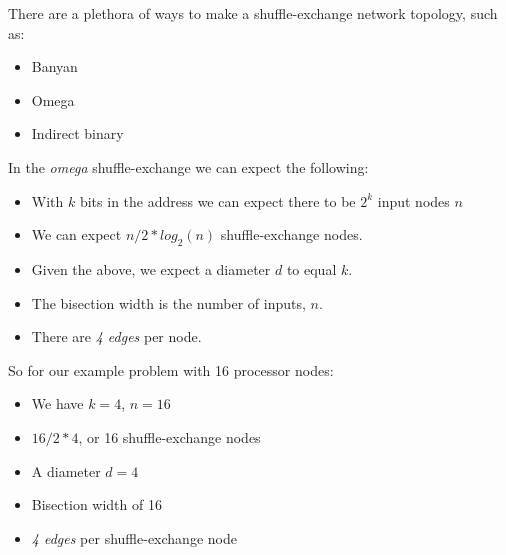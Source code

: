 \documentclass{article}
\begin{document}

\noindent There are a plethora of ways to make a shuffle-exchange network topology, such as:
\begin{itemize}
    \item Banyan
    \item Omega
    \item Indirect binary
\end{itemize}

\noindent In the \textit{omega} shuffle-exchange we can expect the following:
\begin{itemize}
    \item With $k$ bits in the address we can expect there to be $2^k$ input nodes $n$
    \item We can expect $n / 2 * log_2(n)$ shuffle-exchange nodes.
    \item Given the above, we expect a diameter $d$ to equal $k$.
    \item The bisection width is the number of inputs, $n$.
    \item There are \textit{4 edges} per node.
\end{itemize}

\noindent So for our example problem with 16 processor nodes:
\begin{itemize}
    \item We have $k = 4$, $n = 16$
    \item $16 / 2 * 4$, or 16 shuffle-exchange nodes
    \item A diameter $d = 4$
    \item Bisection width of 16
    \item \textit{4 edges} per shuffle-exchange node
\end{itemize}
\end{document}
